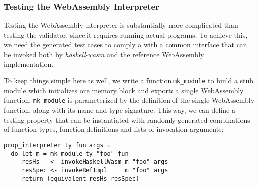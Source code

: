 \documentclass[acmsmall, anonymous]{acmart}
\begin{document}


\subsubsection{Testing the WebAssembly Interpreter}

Testing the WebAssembly interpreter is substantially more complicated than
testing the validator, since it requires running actual programs.
%
To achieve this, we need the generated test cases to comply a with a common
interface that can be invoked both by \textit{haskell-wasm} and the reference
WebAssembly implementation.


To keep things simple here as well, we write a function \texttt{mk\_module} to
build a stub module which initializes one memory block and exports a single
WebAssembly function.
%
\texttt{mk\_module} is parameterized by the definition of the single WebAssembly
function, along with its name and type signature.
%
%
%
This way, we can define a testing property that can be instantiated with
randomly generated combinations of function types, function definitions and
lists of invocation arguments:


\begin{verbatim}
prop_interpreter ty fun args =
  do let m = mk_module ty "foo" fun
     resHs   <- invokeHaskellWasm m "foo" args
     resSpec <- invokeRefImpl     m "foo" args
     return (equivalent resHs resSpec)
\end{verbatim}
\end{document}

